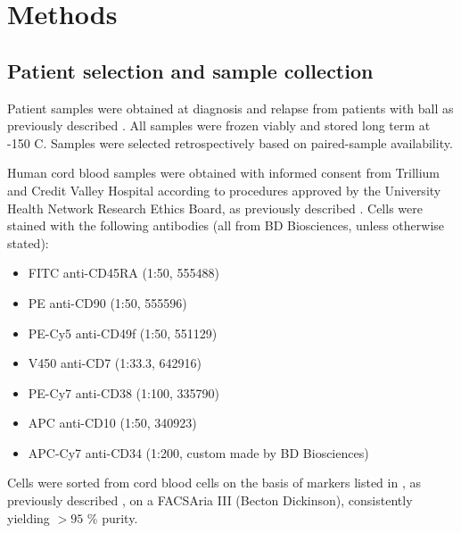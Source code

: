 \section{Methods}

\subsection{Patient selection and sample collection}

Patient samples were obtained at diagnosis and relapse from patients with \gls{ball} as previously described \cite{dobsonRelapseFatedLatentDiagnosis2020}.
All samples were frozen viably and stored long term at -150 \textdegree C.
Samples were selected retrospectively based on paired-sample availability.

Human cord blood samples were obtained with informed consent from Trillium and Credit Valley Hospital according to procedures approved by the University Health Network Research Ethics Board, as previously described \cite{dobsonRelapseFatedLatentDiagnosis2020}.
Cells were stained with the following antibodies (all from BD Biosciences, unless otherwise stated):

\begin{itemize}
  \item FITC anti-CD45RA (1:50, 555488)
  \item PE anti-CD90 (1:50, 555596)
  \item PE-Cy5 anti-CD49f (1:50, 551129)
  \item V450 anti-CD7 (1:33.3, 642916)
  \item PE-Cy7 anti-CD38 (1:100, 335790)
  \item APC anti-CD10 (1:50, 340923)
  \item APC-Cy7 anti-CD34 (1:200, custom made by BD Biosciences)
\end{itemize}

Cells were sorted from cord blood cells on the basis of markers listed in , as previously described \cite{nottaIsolationSingleHuman2011}, on a FACSAria III (Becton Dickinson), consistently yielding $> 95$ \% purity.


